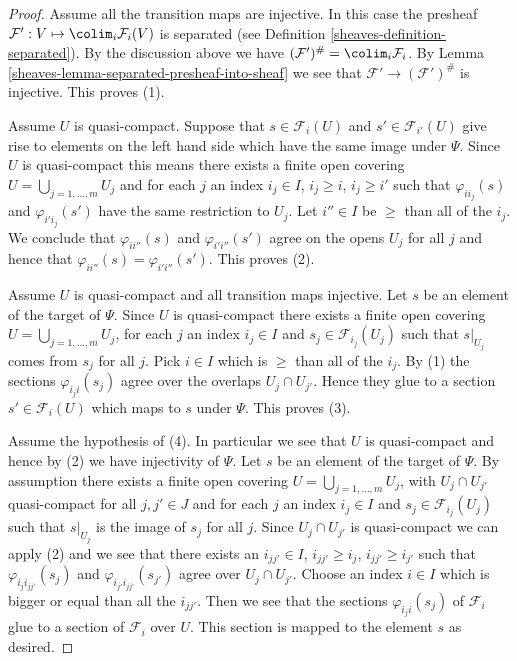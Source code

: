 \begin{proof}

Assume all the transition maps are injective. In this case the presheaf
$\mathcal{F}' : V \mapsto \colim_i \mathcal{F}_i(V)$ is
separated (see Definition \ref{sheaves-definition-separated}).
By the discussion above we have
$(\mathcal{F}')^\# = \colim_i \mathcal{F}_i$.
By Lemma \ref{sheaves-lemma-separated-presheaf-into-sheaf} we see that
$\mathcal{F}' \to (\mathcal{F}')^\#$ is injective. This proves (1).

\medskip\noindent
Assume $U$ is quasi-compact.
Suppose that $s \in \mathcal{F}_i(U)$ and
$s' \in \mathcal{F}_{i'}(U)$ give rise to elements on
the left hand side which have the same image under $\Psi$.
Since $U$ is quasi-compact this means there exists
a finite open covering $U = \bigcup_{j = 1, \ldots, m} U_j$
and for each $j$ an index $i_j \in I$, $i_j \geq i$, $i_j \geq i'$
such that $\varphi_{ii_j}(s)$ and $\varphi_{i'i_j}(s')$ have the
same restriction to $U_j$.
Let $i''\in I$ be $\geq$ than all of the $i_j$.
We conclude that $\varphi_{ii''}(s)$ and $\varphi_{i'i''}(s')$
agree on the opens $U_j$ for all $j$ and hence that
$\varphi_{ii''}(s) = \varphi_{i'i''}(s')$. This proves (2).

\medskip\noindent
Assume $U$ is quasi-compact and all transition maps injective.
Let $s$ be an element of the target of $\Psi$.
Since $U$ is quasi-compact
there exists a finite open covering $U = \bigcup_{j = 1, \ldots, m} U_j$,
for each $j$ an index $i_j \in I$ and $s_j \in \mathcal{F}_{i_j}(U_j)$
such that $s|_{U_j}$ comes from $s_j$ for all $j$.
Pick $i \in I$ which is $\geq$ than all of the $i_j$.
By (1) the sections $\varphi_{i_ji}(s_j)$ agree over the
overlaps $U_j \cap U_{j'}$. Hence they glue to a section
$s' \in \mathcal{F}_i(U)$ which maps to $s$ under $\Psi$.
This proves (3).

\medskip\noindent
Assume the hypothesis of (4). In particular we see that
$U$ is quasi-compact and hence by (2) we have injectivity of $\Psi$.
Let $s$ be an element of the target of $\Psi$.
By assumption there  exists a finite open covering
$U = \bigcup_{j = 1, \ldots, m} U_j$, with $U_j \cap U_{j'}$
quasi-compact for all $j, j' \in J$ and
for each $j$ an index $i_j \in I$ and $s_j \in \mathcal{F}_{i_j}(U_j)$
such that $s|_{U_j}$ is the image of $s_j$ for all $j$.
Since $U_j \cap U_{j'}$ is quasi-compact we can apply (2)
and we see that there exists an $i_{jj'} \in I$,
$i_{jj'} \geq i_j$, $i_{jj'} \geq i_{j'}$ such that
$\varphi_{i_ji_{jj'}}(s_j)$ and $\varphi_{i_{j'}i_{jj'}}(s_{j'})$
agree over $U_j \cap U_{j'}$. Choose an index $i \in I$
which is bigger or equal than all the $i_{jj'}$. Then we see that
the sections $\varphi_{i_ji}(s_j)$ of $\mathcal{F}_i$ glue
to a section of $\mathcal{F}_i$ over $U$. This section is mapped
to the element $s$ as desired.
\end{proof}

